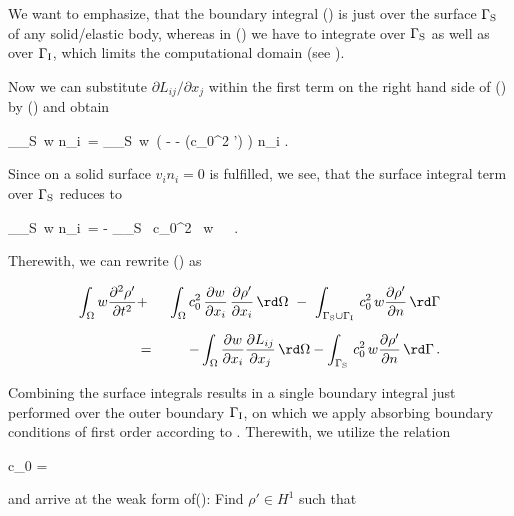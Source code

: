 \documentclass[a4paper,10pt]{article}
\begin{document}
\noindent
We want  to emphasize, that  the boundary integral ()  is just
over the  surface $\Gamma_{\rm S}$  of any solid/elastic body,  whereas in
() we have to integrate  over $\Gamma_{\rm S}$ as well as over
$\Gamma_{\rm   I}$,   which   limits   the   computational   domain   (see
).

Now we  can substitute $\partial L_{ij}  / \partial x_j$  within the first
term on the  right hand side of ()  by () and
obtain

\int_{\Gamma_{\rm S}}\, w  n_i\,
\rd \Gamma
= \int_{\Gamma_{\rm S}}\, w\, \left( -  -  (c_0^2 \rho')
\right)  n_i\,\rd \Gamma\,.
\ee

\noindent
Since on  a solid surface  $v_i n_i  = 0$ is  fulfilled, we see,  that the
surface integral term over $\Gamma_{\rm S}$ reduces to

\int_{\Gamma_{\rm S}}\, w  n_i\,
\rd \Gamma = - \int_{\Gamma_{\rm S}} \, c_0^2 \, w \, \, \rd\Gamma\,.
\ee

\noindent
Therewith, we can rewrite () as

\begin{eqnarray}
\int_\Omega w \frac{\partial^2 \rho'}{\partial t^2} 
& + & \ \int_\Omega c_0^2\, \frac{\partial w}{\partial x_i} \, \frac{\partial
  \rho'}{\partial x_i} \, \rd \Omega 
\ -\ \int_{\Gamma_{\rm S} \cup \Gamma_{\rm I}}\, c_0^2 \, w
\frac{\partial \rho'}{\partial n}\, \rd \Gamma \nonumber \\[2mm]
&=&
- \int_\Omega \frac{\partial w}{\partial x_i} \frac{\partial
  L_{ij}}{\partial x_j}\, \rd \Omega -
\int_{\Gamma_{\rm S}}\, c_0^2 \, w \frac{\partial \rho'}{\partial n}\, \rd \Gamma
\,.
\end{eqnarray}

\noindent  Combining  the  surface  integrals  results in  a  single  boundary
integral just performed over the  outer boundary $\Gamma_{\rm I}$, on which we
apply   absorbing   boundary   conditions   of  first   order   according   to
\cite{Engquist1977}. Therewith, we utilize the relation

c_0  = 
\ee

\noindent and  arrive at the  weak form of(): Find  $\rho' \in
H^1$ such that
\end{document}
